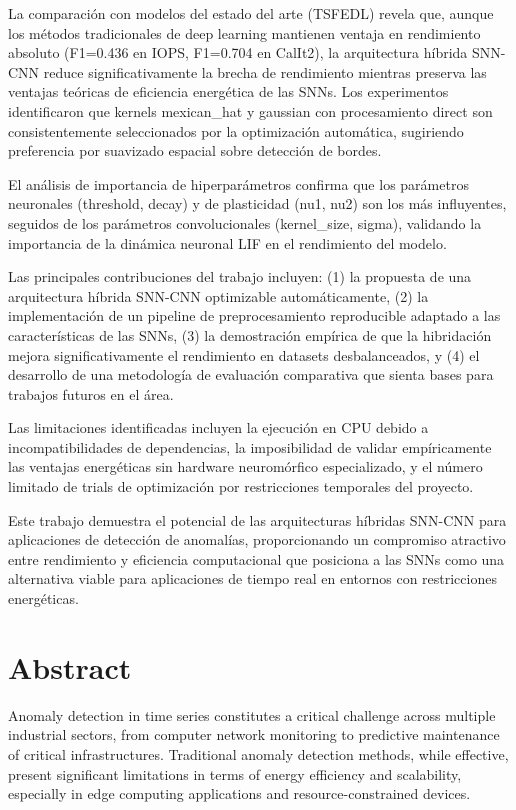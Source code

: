La comparación con modelos del estado del arte (TSFEDL) revela que, aunque los métodos tradicionales de deep learning mantienen ventaja en rendimiento absoluto (F1=0.436 en IOPS, F1=0.704 en CalIt2), la arquitectura híbrida SNN-CNN reduce significativamente la brecha de rendimiento mientras preserva las ventajas teóricas de eficiencia energética de las SNNs. Los experimentos identificaron que kernels mexican\_hat y gaussian con procesamiento direct son consistentemente seleccionados por la optimización automática, sugiriendo preferencia por suavizado espacial sobre detección de bordes.

El análisis de importancia de hiperparámetros confirma que los parámetros neuronales (threshold, decay) y de plasticidad (nu1, nu2) son los más influyentes, seguidos de los parámetros convolucionales (kernel\_size, sigma), validando la importancia de la dinámica neuronal LIF en el rendimiento del modelo.

Las principales contribuciones del trabajo incluyen: (1) la propuesta de una arquitectura híbrida SNN-CNN optimizable automáticamente, (2) la implementación de un pipeline de preprocesamiento reproducible adaptado a las características de las SNNs, (3) la demostración empírica de que la hibridación mejora significativamente el rendimiento en datasets desbalanceados, y (4) el desarrollo de una metodología de evaluación comparativa que sienta bases para trabajos futuros en el área.

Las limitaciones identificadas incluyen la ejecución en CPU debido a incompatibilidades de dependencias, la imposibilidad de validar empíricamente las ventajas energéticas sin hardware neuromórfico especializado, y el número limitado de trials de optimización por restricciones temporales del proyecto.

Este trabajo demuestra el potencial de las arquitecturas híbridas SNN-CNN para aplicaciones de detección de anomalías, proporcionando un compromiso atractivo entre rendimiento y eficiencia computacional que posiciona a las SNNs como una alternativa viable para aplicaciones de tiempo real en entornos con restricciones energéticas.

\section{Abstract}

Anomaly detection in time series constitutes a critical challenge across multiple industrial sectors, from computer network monitoring to predictive maintenance of critical infrastructures. Traditional anomaly detection methods, while effective, present significant limitations in terms of energy efficiency and scalability, especially in edge computing applications and resource-constrained devices.

